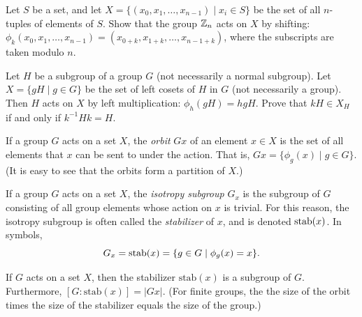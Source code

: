 \begin{problem}\label{prob:shiftaction}
Let $S$ be a set, and let $X = \{(x_0, x_1, \ldots, x_{n-1}) \mid x_i \in S \}$ be the set of all $n$-tuples of elements of $S$. Show that the group $\mathbb{Z}_n$ acts on $X$ by shifting: $\phi_k(x_0,x_1,\ldots,x_{n-1}) = (x_{0+k}, x_{1+k}, \ldots, x_{n-1+k})$, where the subscripts are taken modulo $n$.
\end{problem}

\begin{problem}\label{prob:leftcosetact}
Let $H$ be a subgroup of a group $G$ (not necessarily a normal subgroup).  Let $X = \{gH \mid g\in G\}$ be the set of left cosets of $H$ in $G$ (not necessarily a group).  Then $H$ acts on $X$ by left multiplication: $\phi_h(gH) = hgH$.  Prove that $kH \in X_H$ if and only if $k^{-1}Hk = H$.
\end{problem}

\begin{definition}
 If a group $G$ acts on a set $X$, the \emph{orbit} $Gx$ of an element $x \in X$ is the set of all elements that $x$ can be sent to under the action.  That is, $Gx = \{ \phi_g(x) \mid g \in G \}$.  (It is easy to see that the orbits form a partition of $X$.)
\end{definition}

\begin{definition}
 If a group $G$ acts on a set $X$, the \emph{isotropy subgroup} $G_x$ is the subgroup of $G$ consisting of all group elements whose action on $x$ is trivial.  For this reason, the isotropy subgroup is often called the \emph{stabilizer} of $x$, and is denoted $\operatorname{stab}(x)$.  In symbols,
 $$G_x = \operatorname{stab}(x) = \{ g \in G \mid \phi_g(x) = x \}.$$
\end{definition}

\begin{theorem}\label{thm:orbitstab}
 If $G$ acts on a set $X$, then the stabilizer $\mbox{stab}(x)$ is a subgroup of $G$. Furthermore, $[G:\mbox{stab}(x)] = \lvert Gx \rvert$. (For finite groups, the the size of the orbit times the size of the stabilizer equals the size of the group.)
\begin{annotation}
\end{annotation}
\end{theorem}

